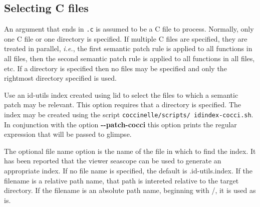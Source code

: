 

\subsection{Selecting C files}

An argument that ends in {\tt .c} is assumed to be a C file to process.
Normally, only one C file or one directory is specified.  If multiple C
files are specified, they are treated in parallel, {\em i.e.}, the first
semantic patch rule is applied to all functions in all files, then the
second semantic patch rule is applied to all functions in all files, etc.
If a directory is specified then no files may be specified and only the
rightmost directory specified is used.



{ Use an id-utils index created using lid to select
  the files to which a semantic patch may be relevant.  This option
  requires that a directory is specified.  The index may be created using
  the script {\tt coccinelle/scripts/ idindex-cocci.sh}.  In conjunction
  with the option {\bf -{}-patch-cocci} this option prints the regular
  expression that will be passed to glimpse.

The optional file name option is the name of the file in which to find the
index.  It has been reported that the viewer seascope can be used to
generate an appropriate index.  If no file name is specified, the default
is .id-utils.index.  If the filename is a relative path name, that path is
intereted relative to the target directory.  If the filename is an absolute
path name, beginning with /, it is used as is.
}

